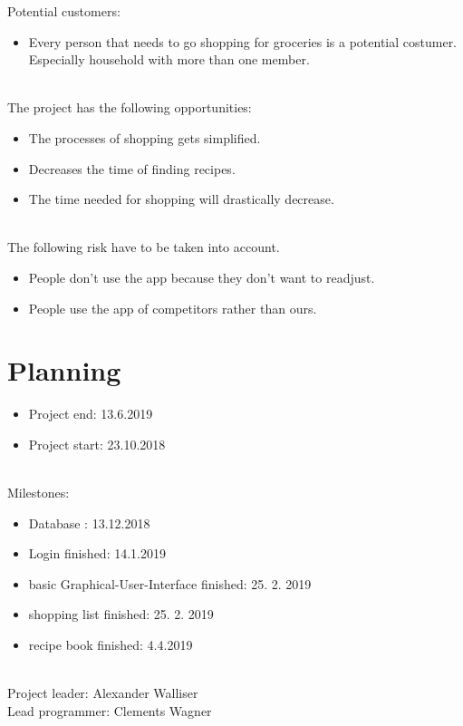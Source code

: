 \documentclass[12pt]{article}
\theoremstyle{definition}
\newenvironment{textblock}{%
   \setlength{\parindent}{0pt}
   \large
   
}{}
\begin{document}
\begin{textblock}
Potential customers:
\begin{itemize}
\item Every person that needs to go shopping for groceries is a potential costumer.\\
Especially household with more than one member.\\\\
\end{itemize}

The project has the following opportunities:
\begin{itemize}
\item The processes of shopping gets simplified.
\item Decreases the time of finding recipes.
\item The time needed for shopping will drastically decrease.\\\\
\end{itemize}

The following risk have to be taken into account.
\begin{itemize}
\item People don’t use the app because they don’t want to readjust.
\item People use the app of competitors rather than ours.
\end{itemize}
\end{textblock}

\pagebreak

\section{Planning}

\begin{textblock}
\begin{itemize}
\item Project end: 13.6.2019
\item Project start: 23.10.2018 \\\\
\end{itemize}

Milestones:
\begin{itemize}
\item Database : 13.12.2018
\item Login finished: 14.1.2019
\item basic Graphical-User-Interface finished: 25. 2. 2019
\item shopping list finished: 25. 2. 2019
\item recipe book finished: 4.4.2019 \\\\
\end{itemize}


Project leader: Alexander Walliser \\
Lead programmer: Clements Wagner

\end{textblock}
\end{document}
